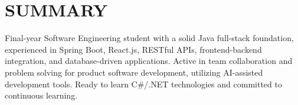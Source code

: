\section{SUMMARY}
\noindent Final-year Software Engineering student with a solid Java full-stack foundation, experienced in Spring Boot, React.js, RESTful APIs, frontend-backend integration, and database-driven applications. Active in team collaboration and problem solving for product software development, utilizing AI-assisted development tools. Ready to learn C\#/.NET technologies and committed to continuous learning.
